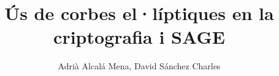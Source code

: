 \documentclass[journal]{IEEEtran}
\begin{document}
%
\title{Ús de corbes el·líptiques en la criptografia i SAGE}
%
%
%

\author{Adrià Alcalá Mena, David Sánchez Charles}%

% 
%



%
{}
% 




\end{document}
